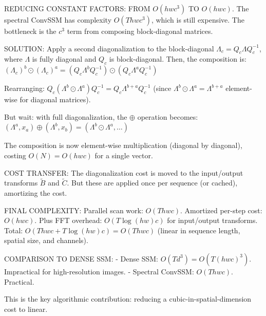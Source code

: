 \documentclass{article}
\begin{document}
\begin{thomasbox}
REDUCING CONSTANT FACTORS: FROM $O(hwc^3)$ TO $O(hwc)$. The spectral ConvSSM has complexity $O(T hwc^3)$, which is still expensive. The bottleneck is the $c^3$ term from composing block-diagonal matrices.

SOLUTION: Apply a second diagonalization to the block-diagonal $\Lambda_c = Q_c \Lambda Q_c^{-1}$, where $\Lambda$ is fully diagonal and $Q_c$ is block-diagonal. Then, the composition is:
$(\Lambda_c)^b \odot (\Lambda_c)^a = (Q_c \Lambda^b Q_c^{-1}) \odot (Q_c \Lambda^a Q_c^{-1})$

Rearranging: $Q_c (\Lambda^b \odot \Lambda^a) Q_c^{-1} = Q_c \Lambda^{b+a} Q_c^{-1}$ (since $\Lambda^b \odot \Lambda^a = \Lambda^{b+a}$ element-wise for diagonal matrices).

But wait: with full diagonalization, the $\oplus$ operation becomes:
$(\Lambda^a, x_a) \oplus (\Lambda^b, x_b) = (\Lambda^b \odot \Lambda^a, \ldots)$

The composition is now element-wise multiplication (diagonal by diagonal), costing $O(N) = O(hwc)$ for a single vector.

COST TRANSFER: The diagonalization cost is moved to the input/output transforms $\widetilde{B}$ and $\widetilde{C}$. But these are applied once per sequence (or cached), amortizing the cost.

FINAL COMPLEXITY: Parallel scan work: $O(T hwc)$. Amortized per-step cost: $O(hwc)$. Plus FFT overhead: $O(T \log(hw) c)$ for input/output transforms. Total: $O(T hwc + T \log(hw) c) = O(T hwc)$ (linear in sequence length, spatial size, and channels).

COMPARISON TO DENSE SSM:
- Dense SSM: $O(T d^3) = O(T (hwc)^3)$. Impractical for high-resolution images.
- Spectral ConvSSM: $O(T hwc)$. Practical.

This is the key algorithmic contribution: reducing a cubic-in-spatial-dimension cost to linear.
\end{thomasbox}
\end{document}
